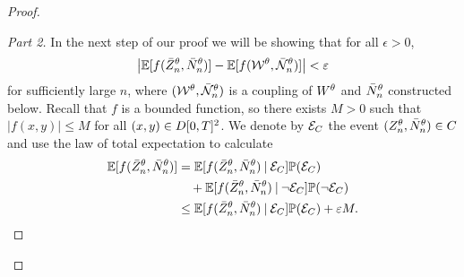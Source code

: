 \begin{proof}
\begin{proof}[Part 2]\renewcommand{\qedsymbol}{}
In the next step of our proof we will be showing that for all $\epsilon > 0$,
\begin{equation*}
\left|\mathbb{E}[ f(\bar{Z}^{\theta}_n, \bar{N}_n^{\theta})] - \mathbb{E}[f(\mathcal{W}^{\theta}, \bar{\mathcal{N}}_n^{\theta})]\right| < \varepsilon
\end{equation*}
for sufficiently large $n$,
where $(\mathcal{W}^{\theta}, \bar{\mathcal{N}}_n^{\theta})$ is a coupling of $W^{\theta}$ and $\bar{N}_n^{\theta}$ constructed below.
Recall that $f$ is a bounded function, so there exists $M>0$ such that $|f(x,y)| \leq M$ for all $(x,y) \in D[0, T]^2$.
We denote by $\mathcal{E}_{C}$ the event $(Z_n^{\theta}, \bar{N}_n^{\theta}) \in C$ and use the law of total expectation to calculate
\begin{equation} \label{E: Estimation step 1}
\begin{aligned}
\mathbb{E}[ f(\bar{Z}^{\theta}_n, \bar{N}_n^{\theta})] 
&= \mathbb{E}[f(\bar{Z}^{\theta}_n, \bar{N}_n^{\theta}) \: | \: \mathcal{E}_{C}] \mathbb{P}(\mathcal{E}_{C}) \\
&\quad + \mathbb{E}[f(\bar{Z}^{\theta}_n, \bar{N}_n^{\theta}) \: | \: \neg\mathcal{E}_{C}] \mathbb{P}(\neg\mathcal{E}_{C}) \\
&\leq \mathbb{E}[f(\bar{Z}^{\theta}_n, \bar{N}_n^{\theta}) \: | \: \mathcal{E}_{C}]\mathbb{P}(\mathcal{E}_{C}) + \varepsilon M.
\end{aligned}
\end{equation}


\end{proof}
\end{proof}
